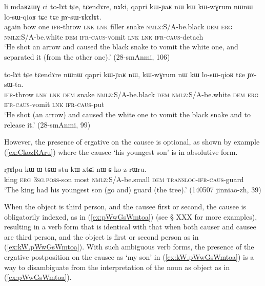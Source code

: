 \begin{exe}
\ex \label{ex:kW.losWqioR1}
 \gll   li mdaʁʑɯɣ ci to-lɤt tɕe, tɕendɤre, nɤki, qapri kɯ-ɲaʁ nɯ kɯ kɯ-wɣrum nɯnɯ lo-sɯ-qioʁ tɕe tɕe ɲɤ-sɯ-ɤkɤlɤt. \\
 again bow one \textsc{ifr}-throw \textsc{lnk} \textsc{lnk} filler snake \textsc{nmlz}:S/A-be.black \textsc{dem} \textsc{erg} \textsc{nmlz}:S/A-be.white \textsc{dem} \textsc{ifr}-\textsc{caus}-vomit \textsc{lnk} \textsc{lnk} \textsc{ifr}-\textsc{caus}-detach \\
 \glt `He shot an arrow and caused the black snake to vomit the white one, and separated it (from the other one).' (28-smAnmi, 106)
\end{exe}

\begin{exe}
\ex \label{ex:kW.losWqioR2}
 \gll  to-lɤt tɕe tɕendɤre nɯnɯ qapri kɯ-ɲaʁ nɯ, kɯ-wɣrum nɯ kɯ lo-sɯ-qioʁ tɕe ɲɤ-sɯ-ta. \\
  \textsc{ifr}-throw \textsc{lnk} \textsc{lnk} \textsc{dem} snake \textsc{nmlz}:S/A-be.black \textsc{dem}  \textsc{nmlz}:S/A-be.white \textsc{dem} \textsc{erg} \textsc{ifr}-\textsc{caus}-vomit \textsc{lnk} \textsc{ifr}-\textsc{caus}-put \\
  \glt `He shot (an arrow) and caused the white one to vomit the black snake and to release it.' (28-smAnmi, 99)
\end{exe}

However, the presence of ergative on the causee is optional, as shown by example (\ref{ex:CkozRAru}) where the causee  `his youngest son' is in absolutive form.

\begin{exe}
\ex \label{ex:CkozRAru}
 \gll rɟɤlpu kɯ ɯ-tɕɯ stu kɯ-xtɕi nɯ ɕ-ko-z-rɯru. \\
 king \textsc{erg} \textsc{3sg}.\textsc{poss}-son most \textsc{nmlz}:S/A-be.small \textsc{dem} \textsc{transloc}-\textsc{ifr}-\textsc{caus}-guard \\
 \glt  `The king had his youngest son (go and) guard (the tree).' (140507 jinniao-zh, 39)
\end{exe}

When the object is third person, and the causee first or second, the causee is obligatorily indexed, as in (\ref{ex:pWwGsWmtoa}) (see § XXX for more examples), resulting in a verb form that is identical with that when both causer and causee are third person, and the object is first or second person as in (\ref{ex:kW.pWwGsWmtoa}). With such ambiguous verb forms, the presence of the ergative postposition on the causee as  `my son' in (\ref{ex:kW.pWwGsWmtoa}) is a way to disambiguate from the interpretation of the noun as object as in (\ref{ex:pWwGsWmtoa}). 

